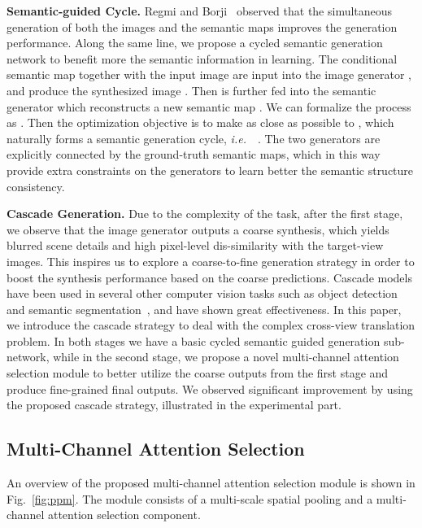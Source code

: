\documentclass[10pt,twocolumn,letterpaper]{article}
\def\ie{\textit{i.e.}~}
\begin{document}
\par\noindent \textbf{Semantic-guided Cycle.}
Regmi and Borji~\cite{regmi2018cross} observed that the simultaneous generation of both the images and the semantic maps improves the generation performance. Along the same line, we propose a cycled semantic generation network to benefit more the semantic information in learning. The conditional semantic map  together with the input image  are input into the image generator , and produce the synthesized image . Then  is further fed into the semantic generator  which reconstructs a new semantic map . We can formalize the process as . 
Then the optimization objective is to make  as close as possible to , which naturally forms a semantic generation cycle, \ie~. The two generators are explicitly connected by the ground-truth semantic maps, which in this way provide extra constraints on the generators to learn better the semantic structure consistency. 

\noindent \textbf{Cascade Generation.} Due to the complexity of the task, after the first stage, we observe that the image generator  outputs a coarse synthesis, which yields blurred scene details and high pixel-level dis-similarity with the target-view images. This inspires us to explore a coarse-to-fine generation strategy in order to boost the synthesis performance based on the coarse predictions. Cascade models have been used in several other computer vision tasks such as object detection~\cite{chen2014joint} and semantic segmentation~\cite{dai2016instance}, and have shown great effectiveness. In this paper, we introduce the cascade strategy to deal with the complex cross-view translation problem. In both stages we have a basic cycled semantic guided generation sub-network, while in the second stage, we propose a novel multi-channel attention selection module to better utilize the coarse outputs from the first stage and produce fine-grained final outputs. We observed significant improvement by using the proposed cascade strategy, illustrated in the experimental part. 

\subsection{Multi-Channel Attention Selection}
\vspace{-0.2cm}
An overview of the proposed multi-channel attention selection module  is shown in Fig.~\ref{fig:ppm}. The module consists of a multi-scale spatial pooling and a multi-channel attention selection component. 
\end{document}
